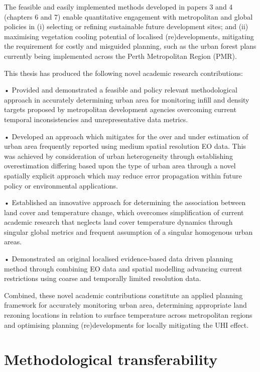 \documentclass[]{book}
\begin{document}
The feasible and easily implemented methods developed in papers 3 and 4
(chapters 6 and 7) enable quantitative engagement with metropolitan and
global policies in (i) selecting or refining sustainable future
development sites; and (ii) maximising vegetation cooling potential of
localised (re)developments, mitigating the requirement for costly and
misguided planning, such as the urban forest plans currently being
implemented across the Perth Metropolitan Region (PMR).

This thesis has produced the following novel academic research
contributions:

• Provided and demonstrated a feasible and policy relevant
methodological approach in accurately determining urban area for
monitoring infill and density targets proposed by metropolitan
development agencies overcoming current temporal inconsistencies and
unrepresentative data metrics.

• Developed an approach which mitigates for the over and under
estimation of urban area frequently reported using medium spatial
resolution EO data. This was achieved by consideration of urban
heterogeneity through establishing overestimation differing based upon
the type of urban area through a novel spatially explicit approach which
may reduce error propagation within future policy or environmental
applications.

• Established an innovative approach for determining the association
between land cover and temperature change, which overcomes
simplification of current academic research that neglects land cover
temperature dynamics through singular global metrics and frequent
assumption of a singular homogenous urban areas.

• Demonstrated an original localised evidence-based data driven planning
method through combining EO data and spatial modelling advancing current
restrictions using coarse and temporally limited resolution data.

Combined, these novel academic contributions constitute an applied
planning framework for accurately monitoring urban area, determining
appropriate land rezoning locations in relation to surface temperature
across metropolitan regions and optimising planning (re)developments for
locally mitigating the UHI effect.

\section{Methodological
transferability}\label{methodological-transferability}
\end{document}
